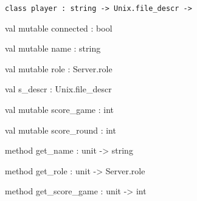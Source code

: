 \documentclass[11pt]{article}
\begin{document}
\begin{ocamldoccode}
{\tt{class player : }}{\tt{string -> Unix.file\_descr -> }}\end{ocamldoccode}
\label{class:Server.player}

\begin{ocamldocobjectend}


\label{val:Server.player.connected}\begin{ocamldoccode}
val mutable connected : bool
\end{ocamldoccode}


\label{val:Server.player.name}\begin{ocamldoccode}
val mutable name : string
\end{ocamldoccode}


\label{val:Server.player.role}\begin{ocamldoccode}
val mutable role : Server.role
\end{ocamldoccode}


\label{val:Server.player.s-underscoredescr}\begin{ocamldoccode}
val s_descr : Unix.file_descr
\end{ocamldoccode}


\label{val:Server.player.score-underscoregame}\begin{ocamldoccode}
val mutable score_game : int
\end{ocamldoccode}


\label{val:Server.player.score-underscoreround}\begin{ocamldoccode}
val mutable score_round : int
\end{ocamldoccode}


\label{method:Server.player.get-underscorename}\begin{ocamldoccode}
method get_name : unit -> string
\end{ocamldoccode}


\label{method:Server.player.get-underscorerole}\begin{ocamldoccode}
method get_role : unit -> Server.role
\end{ocamldoccode}


\label{method:Server.player.get-underscorescore-underscoregame}\begin{ocamldoccode}
method get_score_game : unit -> int
\end{ocamldoccode}



\end{ocamldocobjectend}
\end{document}
